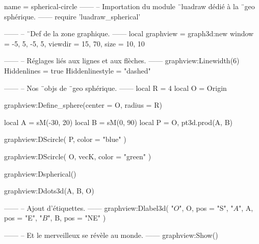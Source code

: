 \documentclass{standalone}
\begin{document}
\begin{luadraw}{name = spherical-circle}
------
-- Importation du module ¨luadraw dédié à la ¨geo sphérique.
------
require 'luadraw_spherical'

------
-- ¨Def de la zone graphique.
------
local graphview = graph3d:new{
  window  = {-5, 5, -5, 5},
  viewdir = {15, 70},
  size    = {10, 10}
}

------
-- Réglages liés aux lignes et aux flèches.
------
graphview:Linewidth(6)
Hiddenlines     = true
Hiddenlinestyle = "dashed"

------
-- Nos ¨objs de ¨geo sphérique.
------
local R = 4
local O = Origin

graphview:Define_sphere({center = O, radius = R})

local A = sM(-30, 20)
local B = sM(0, 90)
local P = {O, pt3d.prod(A, B)}

graphview:DScircle(
  P,
  {color = "blue"}
)

graphview:DScircle(
  {O, vecK},
  {color = "green"}
)

graphview:Dspherical()

graphview:Ddots3d({A, B, O})

------
-- Ajout d'étiquettes.
------
graphview:Dlabel3d(
  "$O$", O, {pos = "S"},
  "$A$", A, {pos = "E"},
  "$B$", B, {pos = "NE"}
)

------
-- Et le merveilleux se révèle au monde.
------
graphview:Show()
\end{luadraw}
\end{document}
